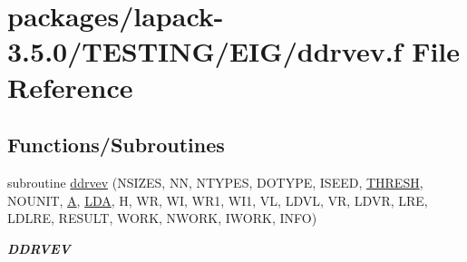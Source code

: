 \hypertarget{ddrvev_8f}{}\section{packages/lapack-\/3.5.0/\+T\+E\+S\+T\+I\+N\+G/\+E\+I\+G/ddrvev.f File Reference}
\label{ddrvev_8f}
\subsection*{Functions/\+Subroutines}
\begin{DoxyCompactItemize}
\item 
subroutine \hyperlink{group__double__eig_ga11aeae4727a8a3236db6a56d3ca220c1}{ddrvev} (N\+S\+I\+Z\+E\+S, N\+N, N\+T\+Y\+P\+E\+S, D\+O\+T\+Y\+P\+E, I\+S\+E\+E\+D, \hyperlink{zlaqgs_8c_a0656018abfc9fa2821827415f5d5ea57}{T\+H\+R\+E\+S\+H}, N\+O\+U\+N\+I\+T, \hyperlink{classA}{A}, \hyperlink{example__user_8c_ae946da542ce0db94dced19b2ecefd1aa}{L\+D\+A}, H, W\+R, W\+I, W\+R1, W\+I1, V\+L, L\+D\+V\+L, V\+R, L\+D\+V\+R, L\+R\+E, L\+D\+L\+R\+E, R\+E\+S\+U\+L\+T, W\+O\+R\+K, N\+W\+O\+R\+K, I\+W\+O\+R\+K, I\+N\+F\+O)
\begin{DoxyCompactList}\small\item\em {\bfseries D\+D\+R\+V\+E\+V} \end{DoxyCompactList}\end{DoxyCompactItemize}
